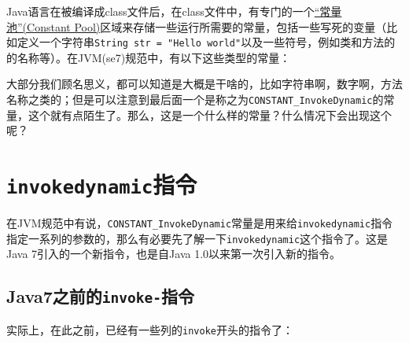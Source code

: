 \documentclass[12pt]{article}
\begin{document}
\makeblogtitle

Java语言在被编译成class文件后，在class文件中，有专门的一个\href{https://docs.oracle.com/javase/specs/jvms/se7/html/jvms-4.html\#jvms-4.4}{``常量池''(Constant Pool)}区域来存储一些运行所需要的常量，包括一些写死的变量（比如定义一个字符串\texttt{String\ str\ =\ "Hello\ world"}以及一些符号，例如类和方法的的名称等）。在JVM(se7)规范中，有以下这些类型的常量：

\begin{Shaded}
\begin{Highlighting}[]
\end{Highlighting}
\end{Shaded}

大部分我们顾名思义，都可以知道是大概是干啥的，比如字符串啊，数字啊，方法名称之类的；但是可以注意到最后面一个是称之为\texttt{CONSTANT\_InvokeDynamic}的常量，这个就有点陌生了。那么，这是一个什么样的常量？什么情况下会出现这个呢？

\section{\texorpdfstring{\texttt{invokedynamic}指令}{invokedynamic指令}}\label{invokedynamicux6307ux4ee4}

在JVM规范中有说，\texttt{CONSTANT\_InvokeDynamic}常量是用来给\texttt{invokedynamic}指令指定一系列的参数的，那么有必要先了解一下\texttt{invokedynamic}这个指令了。这是Java 7引入的一个新指令，也是自Java 1.0以来第一次引入新的指令。

\subsection{\texorpdfstring{Java7之前的\texttt{invoke-}指令}{Java7之前的invoke-指令}}\label{java7ux4e4bux524dux7684invoke-ux6307ux4ee4}

实际上，在此之前，已经有一些列的\texttt{invoke}开头的指令了：
\end{document}
